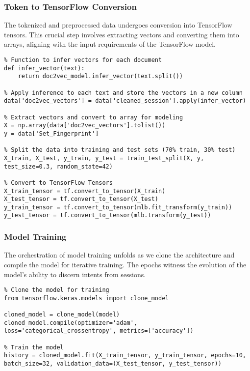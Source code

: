 \subsubsection{Token to TensorFlow Conversion}
The tokenized and preprocessed data undergoes conversion into TensorFlow tensors. This crucial step involves extracting vectors and converting them into arrays, aligning with the input requirements of the TensorFlow model.

\begin{lstlisting}
% Function to infer vectors for each document
def infer_vector(text):
    return doc2vec_model.infer_vector(text.split())

% Apply inference to each text and store the vectors in a new column
data['doc2vec_vectors'] = data['cleaned_session'].apply(infer_vector)

% Extract vectors and convert to array for modeling
X = np.array(data['doc2vec_vectors'].tolist())
y = data['Set_Fingerprint']

% Split the data into training and test sets (70% train, 30% test)
X_train, X_test, y_train, y_test = train_test_split(X, y, test_size=0.3, random_state=42)

% Convert to TensorFlow Tensors
X_train_tensor = tf.convert_to_tensor(X_train)
X_test_tensor = tf.convert_to_tensor(X_test)
y_train_tensor = tf.convert_to_tensor(mlb.fit_transform(y_train))
y_test_tensor = tf.convert_to_tensor(mlb.transform(y_test))
\end{lstlisting}

\subsubsection{Model Training}
The orchestration of model training unfolds as we clone the architecture and compile the model for iterative training. The epochs witness the evolution of the model's ability to discern intents from sessions.

\begin{lstlisting}
% Clone the model for training
from tensorflow.keras.models import clone_model

cloned_model = clone_model(model)
cloned_model.compile(optimizer='adam', loss='categorical_crossentropy', metrics=['accuracy'])

% Train the model
history = cloned_model.fit(X_train_tensor, y_train_tensor, epochs=10, batch_size=32, validation_data=(X_test_tensor, y_test_tensor))
\end{lstlisting}

